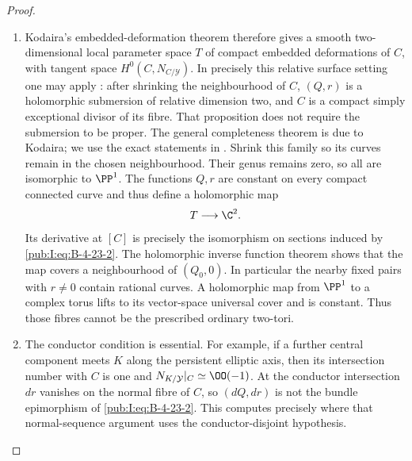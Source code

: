 \begin{proof}
\begin{enumerate}[label=\arabic*.,leftmargin=*]
\item Kodaira's embedded-deformation theorem therefore gives a
smooth two-dimensional local parameter space $T$ of
compact embedded deformations of $C$, with tangent space
$H^0(C,N_{C/\mathcal Y})$. In precisely this relative
surface setting one may apply \citet[arXiv version~2, Proposition~2.3 and its proof, PDF pp.~6--7]{DlousskyTeleman2012AB}: after shrinking
the neighbourhood of $C$, $(Q,r)$ is a holomorphic
submersion of relative dimension two, and $C$ is a
compact simply exceptional divisor of its fibre.
That proposition does not require the submersion to be
proper. The general completeness theorem is due to Kodaira; we use the exact statements in \citet[Section~1, p.~71, and Section~3.1, p.~74]{Merkulov1995D}.
Shrink this family so its curves
remain in the chosen neighbourhood. Their genus remains
zero, so all are isomorphic to $\PP^1$.
The functions $Q,r$ are constant on every compact
connected curve and thus define a holomorphic map
\[
 T\longrightarrow\C^2.
\]
Its derivative at $[C]$ is precisely the isomorphism on
sections induced by \eqref{pub:I:eq:B-4-23-2}. The holomorphic inverse
function theorem shows that the map covers a neighbourhood
of $(Q_0,0)$. In particular the nearby fixed pairs with
$r\ne0$ contain rational curves. A holomorphic map from
$\PP^1$ to a complex torus lifts to its vector-space
universal cover and is constant. Thus those fibres cannot
be the prescribed ordinary two-tori.

\item The conductor condition is essential. For example, if a
further central component meets $K$ along the persistent
elliptic axis, then its intersection number with $C$ is
one and $N_{K/\mathcal Y}|_C\simeq\OO(-1)$.
At the conductor intersection $dr$ vanishes on the normal fibre
of $C$, so $(dQ,dr)$ is not the bundle epimorphism of
\eqref{pub:I:eq:B-4-23-2}. This computes precisely where that
normal-sequence argument uses the conductor-disjoint hypothesis.
\end{enumerate}
\end{proof}